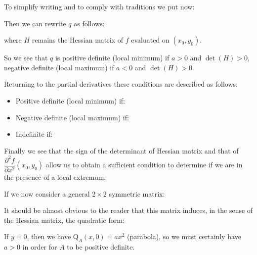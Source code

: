 	To simplify writing and to comply with traditions we put now:
	
	Then we can rewrite $q$ as follows:
	
	where $H$ remains the Hessian matrix of $f$ evaluated on $(x_0,y_0)$.
	
	So we see that $q$ is positive definite (local minimum) if $a>0$ and $\det(H)>0$, negative definite (local maximum) if $a<0$ and $\det(H)>0$.
	
	Returning to the partial derivatives these conditions are described as follows:
	\begin{itemize}
		\item Positive definite (local minimum) if:
		
		
		\item Negative definite (local maximum) if:
		
		
		\item Indefinite if:
		
	\end{itemize}
	Finally we see that the sign of the determinant of Hessian matrix and that of $\dfrac{\partial^2 f}{\partial x^2}(x_0,y_0)$ allow us to obtain a sufficient condition to determine if we are in the presence of a local extremum.
	
	If we now consider a general $2\times 2$ symmetric matrix:
	
	It should be almost obvious to the reader that this matrix induces, in the sense of the Hessian matrix, the quadratic form:
	
	If $y = 0$, then we have $\mathrm{Q}_A(x,0) = ax^2$ (parabola), so we must certainly have $a > 0$ in order for $A$ to be positive definite.
	
